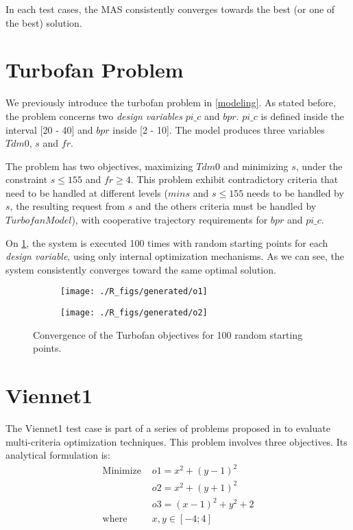 In each test cases, the MAS consistently converges towards the best (or one of the best) solution.

\section{Turbofan Problem}

We previously introduce the turbofan problem in \ref{modeling}. As stated before, the problem concerns two \emph{design variables} $pi\_c$ and $bpr$. $pi\_c$ is defined inside the interval [20 - 40] and $bpr$ inside [2 - 10]. The model produces three variables $Tdm0$, $s$ and $fr$.

The problem has two objectives, maximizing $Tdm0$ and minimizing $s$, under the constraint \(s \leq 155\) and \(fr \geq 4\).
This problem exhibit contradictory criteria that need to be handled at different levels ($min s$ and $s \leq 155$ needs to be handled by $s$, the resulting request from $s$ and the others criteria must be handled by $Turbofan Model$), with cooperative trajectory requirements for $bpr$ and $pi\_c$.

On \figurename{} \ref{snecma_res}, the system is executed 100 times with random starting points for each \emph{design variable}, using only internal optimization mechanisms. As we can see, the system consistently converges toward the same optimal solution.

\begin{figure}[h]
	\begin{subfigure}[b]{0.4\textwidth}
		\centering
		\texttt{[image: ./R\_figs/generated/o1]}	
	\end{subfigure}
	\hfill%
	\begin{subfigure}[b]{0.4\textwidth}
		\centering
		\texttt{[image: ./R\_figs/generated/o2]}	
	\end{subfigure}
	\caption{Convergence of the Turbofan objectives for 100 random starting points.}
	\label{snecma_res}
\end{figure}

\section{Viennet1}

The Viennet1 test case is part of a series of problems proposed in \cite{viennet1996multicriteria} to evaluate multi-criteria optimization techniques. This problem involves three objectives. Its analytical formulation is:
\begin{align*}
\text{Minimize } 	&o1 = x^2 + (y-1)^2 \\
								&o2 = x^2 + (y+1)^2 \\
								&o3 = (x-1)^2 + y^2 +2\\
\text{where } 		&x, y \in [-4;4]						
\end{align*}				

